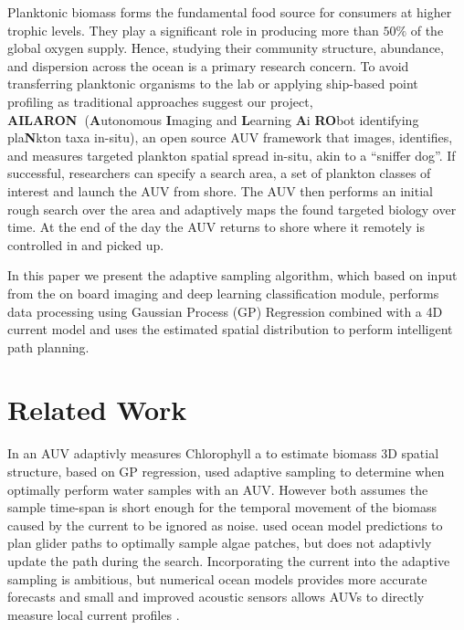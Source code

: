 \documentclass[conference]{IEEEtran}
\def\proj{{\textbf{AILARON\ }}}
\begin{document}
Planktonic biomass forms the fundamental food source for consumers at
higher trophic levels. They play a significant role in producing more
than $50\%$ of the global oxygen supply. Hence, studying their
community structure, abundance, and dispersion across the ocean is a
primary research concern. To avoid transferring planktonic organisms
to the lab or applying ship-based point profiling as traditional
approaches suggest our project, \proj (\textbf{A}utonomous
\textbf{I}maging and \textbf{L}earning \textbf{A}i \textbf{RO}bot
identifying pla\textbf{N}kton taxa in-situ), an open source AUV
framework that images, identifies, and measures targeted plankton
spatial spread in-situ, akin to a ``sniffer dog''. If successful, researchers can specify a search area, a set of plankton classes of interest and launch the AUV from shore. The AUV then performs an initial rough search over the area and adaptively maps the found targeted biology over time. At the end of the
day the AUV returns to shore where it remotely is controlled in and picked up.

In this paper we present the adaptive sampling algorithm, which based
on input from the on board imaging and deep learning classification
module, performs data processing using Gaussian Process (GP)
Regression combined with a 4D current model and uses the estimated
spatial distribution to perform intelligent path planning.


\section{Related Work}

In \cite{fossum18b} an AUV adaptivly measures Chlorophyll a to
estimate biomass 3D spatial structure, based on GP regression,
\cite{das15} used adaptive sampling to determine when optimally
perform water samples with an AUV.  However both assumes the sample
time-span is short enough for the temporal movement of the biomass
caused by the current to be ignored as noise.  \cite{smith10} used
ocean model predictions to plan glider paths to optimally sample algae
patches, but does not adaptivly update the path during the search.
Incorporating the current into the adaptive sampling is ambitious, but
numerical ocean models provides more accurate forecasts and small and
improved acoustic sensors allows AUVs to directly measure local
current profiles \cite{Fong2006, Cusi2017}.
\end{document}
